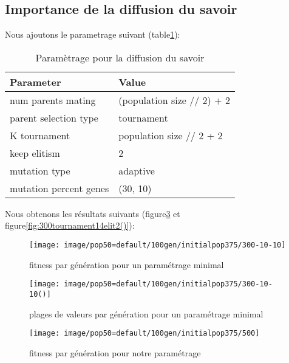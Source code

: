 \documentclass[journal, a4paper]{IEEEtran}
\begin{document}
\subsection{Importance de la diffusion du savoir}
	Nous ajoutons le parametrage suivant (table\ref{tab:simParameters}):
	\begin{table}[!hbt]
		\begin{center}
		\caption{Paramètrage pour la diffusion du savoir}
		\label{tab:simParameters}
		\begin{tabular}{|l|l|}
			\hline
			\textbf{Parameter} & \textbf{Value} \\
			\hline
			num parents mating & (population size // 2) + 2 \\
			\hline
			parent selection type & tournament \\
			\hline
			K tournament & population size // 2 + 2 \\
			\hline
			keep elitism & 2 \\
			\hline
			mutation type & adaptive \\
			\hline
			mutation percent genes & (30, 10) \\
			\hline
			\end{tabular}
		\end{center}
	\end{table}


	Nous obtenons les résultats suivants (figure\ref{fig:300tournament14elit2} et figure\ref{fig:300tournament14elit2()}):
\begin{figure}[!hbt]
  \centering
  \texttt{[image: image/pop50=default/100gen/initialpop375/300-10-10]}
  \caption{fitness par génération pour un paramétrage minimal}
  \label{fig:parameter_minimum_requis}
\end{figure}
\begin{figure}[!hbt]
  \centering
  \texttt{[image: image/pop50=default/100gen/initialpop375/300-10-10()]}
  \caption{plages de valeurs par génération pour un paramétrage minimal}
  \label{fig:parameter_minimum_requis2}
\end{figure}

\begin{figure}[!hbt]
  \texttt{[image: image/pop50=default/100gen/initialpop375/500]}
  \caption{fitness par génération pour notre paramétrage}
  \label{fig:300tournament14elit2}
\end{figure}
\end{document}
